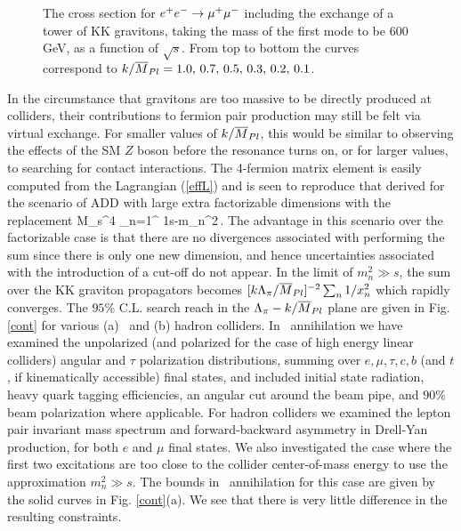 \nn
\begin{figure}[htbp]
\centerline{
}
\vspace*{0.25cm}
\caption{The cross section for $\epem\to\mu^+\mu^-$ including the exchange of
a tower of KK gravitons, taking the mass of the first mode to be 600 GeV,
as a function of $\sqrt s$.  From top to bottom the curves correspond to
$k/\mpl=1.0,\, 0.7,\, 0.5,\, 0.3,\, 0.2,\, 0.1$.}
\label{lineshape}
\end{figure}

In the circumstance that gravitons are too massive to be directly produced at
colliders, their contributions to fermion pair production may still be felt
via virtual exchange.  For smaller values of $k/\mpl$, this would be similar 
to observing the effects of the SM $Z$ boson before the resonance turns on,
or for larger values, to searching for contact interactions.  The 4-fermion
matrix element is easily computed from the Lagrangian (\ref{effL}) and
is seen to reproduce that derived for the scenario of ADD 
with large extra factorizable dimensions\cite{me} with the replacement
\be
{\lambda\over M_s^4} \sum_{n=1}^\infty
{1\over s-m_n^2}\,.
\ee
The advantage in this scenario over the factorizable case is that there are
no divergences associated with performing the sum since there is
only one new dimension,
and hence uncertainties associated with the
introduction of a cut-off do not appear.  In the limit of $m_n^2\gg s$, the
sum over the KK graviton propagators becomes $[k\Lambda_\pi/\mpl]^{-2}
\sum_n 1/x_n^2$ which rapidly converges.  The $95\%$ C.L. search reach
in the $\Lambda_\pi - k/\mpl$ plane are given in Fig. \ref{cont} for 
various (a) \epem\
and (b) hadron colliders.  In \epem\ annihilation we have examined the 
unpolarized (and polarized for the case of high energy linear colliders) 
angular and $\tau$ polarization 
distributions, summing over $e,\mu,\tau,c,b$ (and $t$, if kinematically
accessible) final states, and
included initial state radiation, heavy quark tagging efficiencies, an
angular cut around the beam pipe, and $90\%$ beam polarization where
applicable. For hadron colliders we examined 
the lepton pair invariant mass
spectrum and forward-backward asymmetry in Drell-Yan production, for both
$e$ and $\mu$ final states.  We also investigated the case where the first
two excitations are too close to the collider center-of-mass energy
to use the approximation $m_n^2\gg s$.  The bounds in \epem\ annihilation
for this case are given by the solid curves in Fig. \ref{cont}(a).  We see
that there is very little difference in the resulting constraints.


